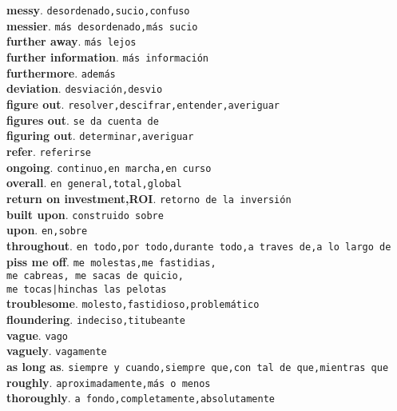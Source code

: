 \documentclass[twocolumn]{article}
\begin{document}
	\textsf{\textbf{messy}}. \texttt{desordenado,sucio,confuso}\\
	\textsf{\textbf{messier}}. \texttt{m\'as desordenado,m\'as sucio}\\
	\textsf{\textbf{further away}}. \texttt{m\'as lejos}\\
	\textsf{\textbf{further information}}. \texttt{m\'as informaci\'on}\\
	\textsf{\textbf{furthermore}}. \texttt{adem\'as}\\
	\textsf{\textbf{deviation}}. \texttt{desviaci\'on,desvio}\\
	\textsf{\textbf{figure out}}. \texttt{resolver,descifrar,entender,averiguar}\\
	\textsf{\textbf{figures out}}. \texttt{se da cuenta de}\\
	\textsf{\textbf{figuring out}}. \texttt{determinar,averiguar}\\
	\textsf{\textbf{refer}}. \texttt{referirse}\\
	\textsf{\textbf{ongoing}}. \texttt{continuo,en marcha,en curso}\\
	\textsf{\textbf{overall}}. \texttt{en general,total,global}\\
	\textsf{\textbf{return on investment,ROI}}. \texttt{retorno de la inversi\'on}\\
	\textsf{\textbf{built upon}}. \texttt{construido sobre}\\
	\textsf{\textbf{upon}}. \texttt{en,sobre}\\
	\textsf{\textbf{throughout}}. \texttt{en todo,por todo,durante todo,a traves de,a lo largo de}\\
	\textsf{\textbf{piss me off}}. \texttt{me molestas,me fastidias,\\ me cabreas, me sacas de quicio,\\ me tocas|hinchas las pelotas}\\
	\textsf{\textbf{troublesome}}. \texttt{molesto,fastidioso,problem\'atico}\\
	\textsf{\textbf{floundering}}. \texttt{indeciso,titubeante}\\
	\textsf{\textbf{vague}}. \texttt{vago}\\
	\textsf{\textbf{vaguely}}. \texttt{vagamente}\\
	\textsf{\textbf{as long as}}. \texttt{siempre y cuando,siempre que,con tal de que,mientras que}\\
	\textsf{\textbf{roughly}}. \texttt{aproximadamente,m\'as o menos}\\
	\textsf{\textbf{thoroughly}}. \texttt{a fondo,completamente,absolutamente}\\
\end{document}
